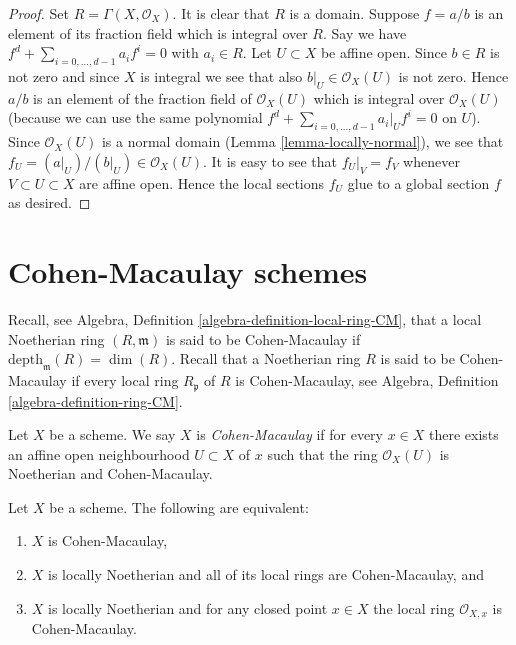 \begin{proof}
Set $R = \Gamma(X, \mathcal{O}_X)$.
It is clear that $R$ is a domain.
Suppose $f = a/b$ is an element of its fraction field
which is integral over $R$. Say we have
$f^d + \sum_{i = 0, \ldots, d - 1} a_i f^i = 0$ with
$a_i \in R$. Let $U \subset X$ be affine open.
Since $b \in R$ is not zero and since $X$ is integral we see
that also $b|_U \in \mathcal{O}_X(U)$ is not zero.
Hence $a/b$ is an element of the fraction field of
$\mathcal{O}_X(U)$ which is integral over $\mathcal{O}_X(U)$
(because we can use the same polynomial
$f^d + \sum_{i = 0, \ldots, d - 1} a_i|_U f^i = 0$ on $U$).
Since $\mathcal{O}_X(U)$ is a normal domain
(Lemma \ref{lemma-locally-normal}), we see that
$f_U = (a|_U)/(b|_U) \in \mathcal{O}_X(U)$. It is easy to
see that $f_U|_V = f_V$ whenever $V \subset U \subset X$ are
affine open. Hence the local sections $f_U$ glue to a global
section $f$ as desired.
\end{proof}










\section{Cohen-Macaulay schemes}
\label{section-Cohen-Macaulay}

\noindent
Recall, see Algebra, Definition \ref{algebra-definition-local-ring-CM},
that a local Noetherian ring $(R, \mathfrak m)$ is
said to be Cohen-Macaulay if $\text{depth}_{\mathfrak m}(R) = \dim(R)$.
Recall that a Noetherian ring $R$ is said to be Cohen-Macaulay if
every local ring $R_{\mathfrak p}$ of $R$ is Cohen-Macaulay,
see Algebra, Definition \ref{algebra-definition-ring-CM}.

\begin{definition}
\label{definition-Cohen-Macaulay}
Let $X$ be a scheme. We say $X$ is {\it Cohen-Macaulay} if
for every $x \in X$ there exists an affine open neighbourhood
$U \subset X$ of $x$ such that the ring $\mathcal{O}_X(U)$ is
Noetherian and Cohen-Macaulay.
\end{definition}

\begin{lemma}
\label{lemma-characterize-Cohen-Macaulay}
Let $X$ be a scheme. The following are equivalent:
\begin{enumerate}
\item $X$ is Cohen-Macaulay,
\item $X$ is locally Noetherian and all of its local rings are Cohen-Macaulay,
and
\item $X$ is locally Noetherian and for any closed point $x \in X$
the local ring $\mathcal{O}_{X, x}$ is Cohen-Macaulay.
\end{enumerate}
\end{lemma}

